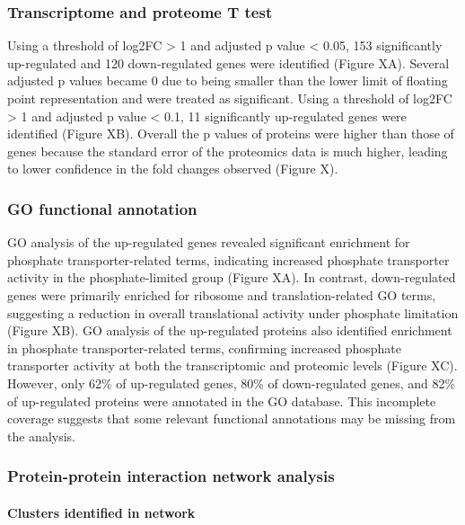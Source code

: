 \subsubsection{Transcriptome and proteome T
test}\label{transcriptome-and-proteome-t-test}

Using a threshold of \textbar log2FC\textbar{} \textgreater{} 1 and
adjusted p value \textless{} 0.05, 153 significantly up-regulated and
120 down-regulated genes were identified (Figure XA). Several adjusted p
values became 0 due to being smaller than the lower limit of floating
point representation and were treated as significant. Using a threshold
of \textbar log2FC\textbar{} \textgreater{} 1 and adjusted p value
\textless{} 0.1, 11 significantly up-regulated genes were identified
(Figure XB). Overall the p values of proteins were higher than those of
genes because the standard error of the proteomics data is much higher,
leading to lower confidence in the fold changes observed (Figure X).

\subsubsection{GO functional annotation}\label{go-functional-annotation}

GO analysis of the up-regulated genes revealed significant enrichment
for phosphate transporter-related terms, indicating increased phosphate
transporter activity in the phosphate-limited group (Figure XA). In
contrast, down-regulated genes were primarily enriched for ribosome and
translation-related GO terms, suggesting a reduction in overall
translational activity under phosphate limitation (Figure XB). GO
analysis of the up-regulated proteins also identified enrichment in
phosphate transporter-related terms, confirming increased phosphate
transporter activity at both the transcriptomic and proteomic levels
(Figure XC). However, only 62\% of up-regulated genes, 80\% of
down-regulated genes, and 82\% of up-regulated proteins were annotated
in the GO database. This incomplete coverage suggests that some relevant
functional annotations may be missing from the analysis.

\subsubsection{Protein-protein interaction network
analysis}\label{protein-protein-interaction-network-analysis}

\paragraph{Clusters identified in
network}\label{clusters-identified-in-network}


